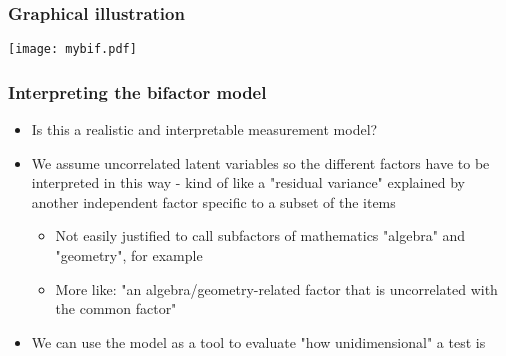 \documentclass[compress]{beamer}
\begin{document}
\begin{frame}[fragile]
\frametitle{Graphical illustration}
\texttt{[image: mybif.pdf]}
\end{frame}

\begin{frame}[fragile]
\frametitle{Interpreting the bifactor model}
\begin{itemize}
\item Is this a realistic and interpretable measurement model?
\item We assume uncorrelated latent variables so the different factors have to be interpreted in this way - kind of like a "residual variance" explained by another independent factor specific to a subset of the items
\begin{itemize}
\item Not easily justified to call subfactors of mathematics "algebra" and "geometry", for example
\item More like: "an algebra/geometry-related factor that is uncorrelated with the common factor"
\end{itemize}
\item We can use the model as a tool to evaluate "how unidimensional" a test is
\end{itemize}
\end{frame}

\end{document}
